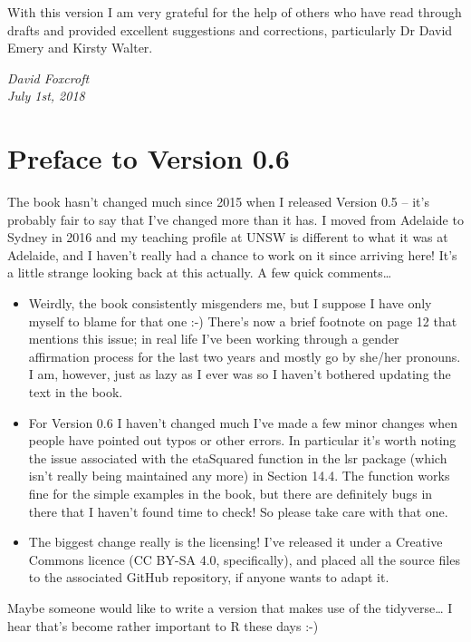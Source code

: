 \documentclass[
  letterpaper,
]{book}
\providecommand{\tightlist}{%
  \setlength{\itemsep}{0pt}\setlength{\parskip}{0pt}}\usepackage{longtable,booktabs,array}
\begin{document}
With this version I am very grateful for the help of others who have
read through drafts and provided excellent suggestions and corrections,
particularly Dr David Emery and Kirsty Walter.

\emph{David Foxcroft\\
July 1st, 2018}

\hypertarget{preface-to-version-0.6}{%
\section*{Preface to Version 0.6}\label{preface-to-version-0.6}}

The book hasn't changed much since 2015 when I released Version 0.5 --
it's probably fair to say that I've changed more than it has. I moved
from Adelaide to Sydney in 2016 and my teaching profile at UNSW is
different to what it was at Adelaide, and I haven't really had a chance
to work on it since arriving here! It's a little strange looking back at
this actually. A few quick comments\ldots{}

\begin{itemize}
\tightlist
\item
  Weirdly, the book consistently misgenders me, but I suppose I have
  only myself to blame for that one :-) There's now a brief footnote on
  page 12 that mentions this issue; in real life I've been working
  through a gender affirmation process for the last two years and mostly
  go by she/her pronouns. I am, however, just as lazy as I ever was so I
  haven't bothered updating the text in the book.
\item
  For Version 0.6 I haven't changed much I've made a few minor changes
  when people have pointed out typos or other errors. In particular it's
  worth noting the issue associated with the etaSquared function in the
  lsr package (which isn't really being maintained any more) in Section
  14.4. The function works fine for the simple examples in the book, but
  there are definitely bugs in there that I haven't found time to check!
  So please take care with that one.
\item
  The biggest change really is the licensing! I've released it under a
  Creative Commons licence (CC BY-SA 4.0, specifically), and placed all
  the source files to the associated GitHub repository, if anyone wants
  to adapt it.
\end{itemize}

Maybe someone would like to write a version that makes use of the
tidyverse\ldots{} I hear that's become rather important to R these days
:-)
\end{document}
